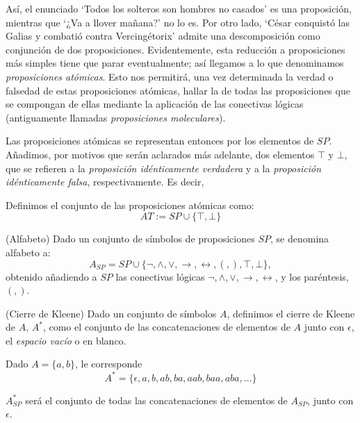 Así, el enunciado `Todos los solteros son hombres no casados' es una proposición, mientras que `¿Va a llover mañana?' no lo es. Por otro lado, `César conquistó las Galias y combatió contra Vercingétorix' admite una descomposición como conjunción de dos proposiciones. Evidentemente, esta reducción a proposiciones más simples tiene que parar eventualmente; así llegamos a lo que denominamos \textit{proposiciones atómicas}. Esto nos permitirá, una vez determinada la verdad o falsedad de estas proposiciones atómicas, hallar la de todas las proposiciones que se compongan de ellas mediante la aplicación de las conectivas lógicas (antiguamente llamadas \textit{proposiciones moleculares}). \

Las proposiciones atómicas se representan entonces por los elementos de $SP$. Añadimos, por motivos que serán aclarados más adelante, dos elementos $\top$ y $\bot$, que se refieren a la \textit{proposición idénticamente verdadera} y a la \textit{proposición idénticamente falsa}, respectivamente. Es decir, 

\begin{definition}\label{def : at}

     Definimos el conjunto de las proposiciones atómicas como:
    \[
        AT := SP\cup \{\top, \bot\}
    \]
\end{definition}


\begin{definition}(Alfabeto)
    Dado un conjunto de símbolos de proposiciones $SP$, se denomina alfabeto a:
    \[
        A_{SP} = SP\cup\{\neg, \land, \lor, \rightarrow, \leftrightarrow, (, ),\top, \bot\},
    \]
    obtenido añadiendo a $SP$ las conectivas lógicas $\neg, \land, \lor, \rightarrow, \leftrightarrow$, y los paréntesis, $(,)$.
\end{definition}    

\begin{definition}(Cierre de Kleene)
    Dado un conjunto de símbolos $A$, definimos el cierre de Kleene de $A$, $A^*$, como el conjunto de las concatenaciones de elementos de $A$ junto con $\epsilon$, el \textit{espacio vacío} o en blanco.
\end{definition}

\begin{example} Dado $A = \{a, b\}$, le corresponde 
\[
    A^* = \{\epsilon, a, b, ab, ba, aab, baa, aba, ...\}
\]
\end{example}
\begin{example}
    $A_{SP}^*$ será el conjunto de todas las concatenaciones de elementos de $A_{SP}$, junto con $\epsilon$.
\end{example}

